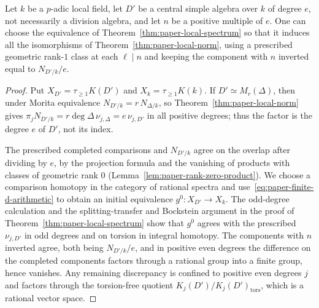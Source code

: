 \begin{lemma}
\label{lem:paper-local-d-arithmetic}
Let $k$ be a $p$-adic local field, let $D'$ be a central simple algebra over $k$ of degree $e$, not necessarily a division algebra, and let $n$ be a positive multiple of $e$.
One can choose the equivalence of Theorem~\ref{thm:paper-local-spectrum} so that it induces all the isomorphisms of Theorem~\ref{thm:paper-local-norm}, using a prescribed geometric rank-$1$ class at each $\ell\mid n$ and keeping the component with $n$ inverted equal to $N_{D'/k}/e$.
\end{lemma}
\begin{proof}
Put $X_{D'}=\tau_{\ge1}K(D')$ and $X_k=\tau_{\ge1}K(k)$.
If $D'\simeq M_r(\Delta)$, then under Morita equivalence $N_{D'/k}=r\,N_{\Delta/k}$, so Theorem~\ref{thm:paper-local-norm} gives $\pi_jN_{D'/k}=r\deg\Delta\,\nu_{j,\Delta}=e\,\nu_{j,D'}$ in all positive degrees; thus the factor is the degree $e$ of $D'$, not its index.

The prescribed completed comparisons and $N_{D'/k}$ agree on the overlap after dividing by $e$, by the projection formula and the vanishing of products with classes of geometric rank $0$ (Lemma~\ref{lem:paper-rank-zero-product}).
We choose a comparison homotopy in the category of rational spectra and use~\eqref{eq:paper-finite-d-arithmetic} to obtain an initial equivalence $g^0\colon X_{D'}\to X_k$.
The odd-degree calculation and the splitting-transfer and Bockstein argument in the proof of Theorem~\ref{thm:paper-local-spectrum} show that $g^0$ agrees with the prescribed $\nu_{j,D'}$ in odd degrees and on torsion in integral homotopy.
The components with $n$ inverted agree, both being $N_{D'/k}/e$, and in positive even degrees the difference on the completed components factors through a rational group into a finite group, hence vanishes.
Any remaining discrepancy is confined to positive even degrees $j$ and factors through the torsion-free quotient $K_j(D')/K_j(D')_{\mathrm{tors}}$, which is a rational vector space.


\end{proof}
